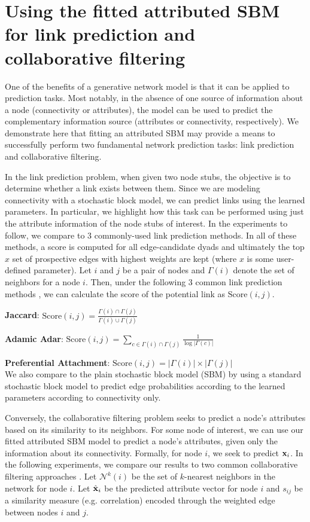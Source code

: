 
\section{Using the fitted attributed SBM for link prediction and collaborative filtering}
One of the benefits of a generative network model is that it can be applied to prediction tasks. Most notably, in the absence of one source of information about a node (connectivity or attributes), the model can be used to predict the complementary information source (attributes or connectivity, respectively). We demonstrate here that fitting an attributed SBM may provide a means to successfully perform two fundamental network prediction tasks: link prediction and collaborative filtering. 

In the link prediction problem, when given two node stubs, the objective is to determine whether a link exists between them. Since we are modeling connectivity with a stochastic block model, we can predict links using the learned parameters.  In particular, we highlight how this task can be performed using just the attribute information of the node stubs of interest. In the experiments to follow, we compare to 3 commonly-used link prediction methods. In all of these methods, a score is computed for all edge-candidate dyads and ultimately the top $x$ set of prospective edges with highest weights are kept (where $x$ is some user-defined parameter). Let $i$ and $j$ be a pair of nodes and $\Gamma(i)$ denote the set of neighbors for a node $i$. Then, under the following 3 common  link prediction methods \cite{linkPredReview}, we can calculate the score of the potential link as $\text{Score}(i,j)$.

{\bf Jaccard}: $\text{Score}(i,j)= \frac{\Gamma(i) \cap \Gamma(j)}{\Gamma(i)\cup \Gamma(j)}$

{\bf Adamic Adar}: $\text{Score}(i,j)=\sum_{c \in \Gamma(i) \cap \Gamma(j)}\frac{1}{\log |\Gamma(c)|}$

{\bf Preferential Attachment}: $\text{Score}(i,j)=|\Gamma(i)|\times |\Gamma(j)|$\\

We also compare to the plain stochastic block model (SBM) by using a standard stochastic block model to predict edge probabilities according to the learned parameters according to connectivity only.

Conversely, the collaborative filtering problem seeks to predict a node's attributes based on its similarity to its neighbors. For some node of interest, we can use our fitted attributed SBM model to predict a node's attributes, given only the information about its connectivity. Formally, for node $i$, we seek to predict ${\bf x}_{i}$. In the following experiments, we compare our results to two common collaborative filtering approaches \cite{collabFilterReview}. Let $\mathcal{N}^{k}(i)$ be the set of $k$-nearest neighbors in the network for node $i$. Let $\hat{{\bf x}}_{i}$ be the predicted attribute vector for node $i$ and $s_{ij}$ be a similarity measure (e.g. correlation) encoded through the weighted edge between nodes $i$ and $j$. 

